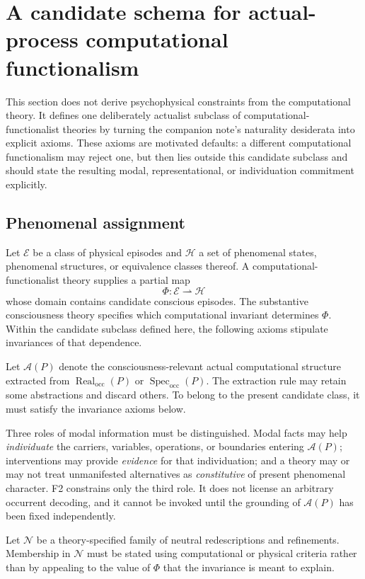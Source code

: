 \documentclass[11pt,a4paper]{article}
\theoremstyle{clean}
\theoremstyle{definition}
\newcommand{\Spec}{\operatorname{Spec}}
\newcommand{\Real}{\operatorname{Real}}
\newcommand{\Occ}{\mathrm{occ}}
\begin{document}
\section{A candidate schema for actual-process computational functionalism}

This section does not derive psychophysical constraints from the computational theory. It defines one deliberately actualist subclass of computational-functionalist theories by turning the companion note's naturality desiderata into explicit axioms. These axioms are motivated defaults: a different computational functionalism may reject one, but then lies outside this candidate subclass and should state the resulting modal, representational, or individuation commitment explicitly.

\subsection{Phenomenal assignment}

Let $\mathcal E$ be a class of physical episodes and $\mathcal H$ a set of phenomenal states, phenomenal structures, or equivalence classes thereof. A computational-functionalist theory supplies a partial map
\[
\Phi:\mathcal E\rightharpoonup\mathcal H
\]
whose domain contains candidate conscious episodes. The substantive consciousness theory specifies which computational invariant determines $\Phi$. Within the candidate subclass defined here, the following axioms stipulate invariances of that dependence.

Let $\mathcal A(P)$ denote the consciousness-relevant actual computational structure extracted from $\Real_\Occ(P)$ or $\Spec_\Occ(P)$. The extraction rule may retain some abstractions and discard others. To belong to the present candidate class, it must satisfy the invariance axioms below.

Three roles of modal information must be distinguished. Modal facts may help \emph{individuate} the carriers, variables, operations, or boundaries entering $\mathcal A(P)$; interventions may provide \emph{evidence} for that individuation; and a theory may or may not treat unmanifested alternatives as \emph{constitutive} of present phenomenal character. F2 constrains only the third role. It does not license an arbitrary occurrent decoding, and it cannot be invoked until the grounding of $\mathcal A(P)$ has been fixed independently.

Let $\mathcal N$ be a theory-specified family of neutral redescriptions and refinements. Membership in $\mathcal N$ must be stated using computational or physical criteria rather than by appealing to the value of $\Phi$ that the invariance is meant to explain.
\end{document}
